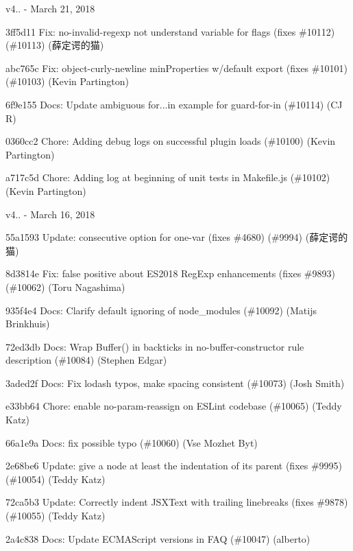 v4.. -\/ March 21, 2018


\begin{DoxyItemize}
\item 3ff5d11 Fix\+: no-\/invalid-\/regexp not understand variable for flags (fixes \#10112) (\#10113) (薛定谔的猫)
\item abc765c Fix\+: object-\/curly-\/newline min\+Properties w/default export (fixes \#10101) (\#10103) (Kevin Partington)
\item 6f9e155 Docs\+: Update ambiguous for...in example for guard-\/for-\/in (\#10114) (CJ R)
\item 0360cc2 Chore\+: Adding debug logs on successful plugin loads (\#10100) (Kevin Partington)
\item a717c5d Chore\+: Adding log at beginning of unit tests in Makefile.\+js (\#10102) (Kevin Partington)
\end{DoxyItemize}

v4.. -\/ March 16, 2018


\begin{DoxyItemize}
\item 55a1593 Update\+: consecutive option for one-\/var (fixes \#4680) (\#9994) (薛定谔的猫)
\item 8d3814e Fix\+: false positive about E\+S2018 Reg\+Exp enhancements (fixes \#9893) (\#10062) (Toru Nagashima)
\item 935f4e4 Docs\+: Clarify default ignoring of node\+\_\+modules (\#10092) (Matijs Brinkhuis)
\item 72ed3db Docs\+: Wrap {\ttfamily Buffer()} in backticks in {\ttfamily no-\/buffer-\/constructor} rule description (\#10084) (Stephen Edgar)
\item 3aded2f Docs\+: Fix lodash typos, make spacing consistent (\#10073) (Josh Smith)
\item e33bb64 Chore\+: enable no-\/param-\/reassign on E\+S\+Lint codebase (\#10065) (Teddy Katz)
\item 66a1e9a Docs\+: fix possible typo (\#10060) (Vse Mozhet Byt)
\item 2e68be6 Update\+: give a node at least the indentation of its parent (fixes \#9995) (\#10054) (Teddy Katz)
\item 72ca5b3 Update\+: Correctly indent J\+S\+X\+Text with trailing linebreaks (fixes \#9878) (\#10055) (Teddy Katz)
\item 2a4c838 Docs\+: Update E\+C\+M\+A\+Script versions in F\+AQ (\#10047) (alberto)
\end{DoxyItemize}

